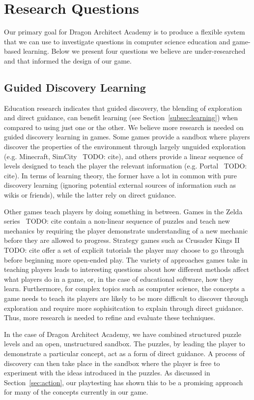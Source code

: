 \documentclass{sig-alternate}
\newcommand{\TODO}[1]{{\color{red} TODO: #1}}
\newcommand{\gametitle}{{\color{RoyalPurple} Dragon Architect Academy}}
\begin{document}
\section{Research Questions}
\label{sec:research}
Our primary goal for \gametitle{} is to produce a flexible system that we can use to investigate questions in computer science education and game-based learning. 
Below we present four questions we believe are under-researched and that informed the design of our game. 

\subsection{Guided Discovery Learning}
Education research indicates that guided discovery, the blending of exploration and direct guidance, can benefit learning (see Section~\ref{subsec:learning}) when compared to using just one or the other. 
We believe more research is needed on guided discovery learning in games. 
Some games provide a sandbox where players discover the properties of the environment through largely unguided exploration (e.g. Minecraft, SimCity~\TODO{cite}), and others provide a linear sequence of levels designed to teach the player the relevant information (e.g. Portal~\TODO{cite}). 
In terms of learning theory, the former have a lot in common with pure discovery learning (ignoring potential external sources of information such as wikis or friends), while the latter rely on direct guidance. 

Other games teach players by doing something in between. 
Games in the Zelda series~\TODO{cite} contain a non-linear sequence of puzzles and teach new mechanics by requiring the player demonstrate understanding of a new mechanic before they are allowed to progress. 
Strategy games such as Crusader Kings II~\TODO{cite} offer a set of explicit tutorials the player may choose to go through before beginning more open-ended play.
The variety of approaches games take in teaching players leads to interesting questions about how different methods affect what players do in a game, or, in the case of educational software, how they learn. 
Furthermore, for complex topics such as computer science, the concepts a game needs to teach its players are likely to be more difficult to discover through exploration and require more sophisitcation to explain through direct guidance. Thus, more research is needed to refine and evaluate these techniques. 

In the case of \gametitle{}, we have combined structured puzzle levels and an open, unstructured sandbox. 
The puzzles, by leading the player to demonstrate a particular concept, act as a form of direct guidance. 
A process of discovery can then take place in the sandbox where the player is free to experiment with the ideas introduced in the puzzles. 
As discussed in Section~\ref{sec:action}, our playtesting has shown this to be a promising approach for many of the concepts currently in our game. 
\end{document}
